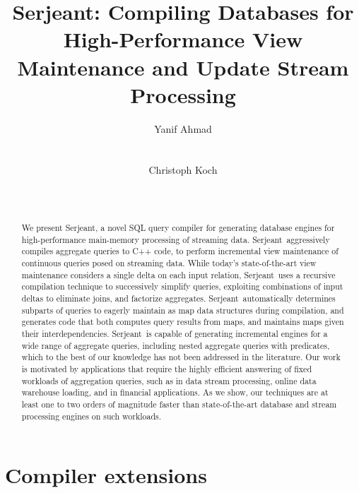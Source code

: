 \documentclass{sig-alternate}
\newcommand{\compiler}{Serjeant}
\begin{document}
\title{Serjeant: Compiling Databases for High-Performance View Maintenance and Update Stream Processing}
\author{
\alignauthor Yanif Ahmad\\
    \\
    \\
\alignauthor Christoph Koch\\
    \\
    \\
}
\maketitle

\begin{abstract}
We present \compiler, a novel SQL query compiler for generating database engines
for high-performance main-memory processing of streaming data. \compiler\
aggressively compiles aggregate queries to C++ code, to perform incremental view
maintenance of continuous queries posed on streaming data. While today's
state-of-the-art view maintenance considers a single delta on each input
relation, \compiler\ uses a recursive compilation technique to successively
simplify queries, exploiting combinations of input deltas to eliminate joins,
and factorize aggregates. \compiler\ automatically determines subparts of
queries to eagerly maintain as map data structures during compilation, and
generates code that both computes query results from maps, and maintains maps
given their interdependencies.  \compiler\ is capable of generating incremental
engines for a wide range of aggregate queries, including nested aggregate
queries with predicates, which to the best of our knowledge has not been
addressed in the literature.  Our work is motivated by applications that require
the highly efficient answering of fixed workloads of aggregation queries, such
as in data stream processing, online data warehouse loading, and in financial
applications. As we show, our techniques are at least one to two orders of
magnitude faster than state-of-the-art database and stream processing engines on
such workloads.
\end{abstract}




\section{Compiler extensions}
\end{document}
